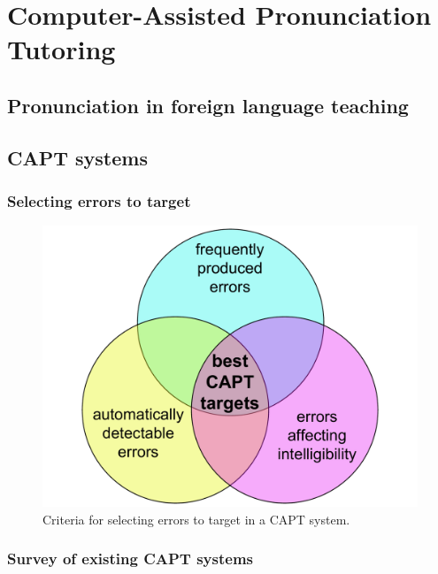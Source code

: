 %
%


\blindtext 

\chapter{Computer-Assisted Pronunciation Tutoring}
	\blindtext
	\section{Pronunciation in foreign language teaching}
	\section{CAPT systems}
		\subsection{Selecting errors to target}
			\begin{center}
			\begin{figure}[htb]
				\includegraphics[width=.7\textwidth]{../img/error-venn}
				\caption{Criteria for selecting errors to target in a CAPT system.}
				\label{fig:errors}
			\end{figure}
			\end{center}
		\subsection{Survey of existing CAPT systems}

